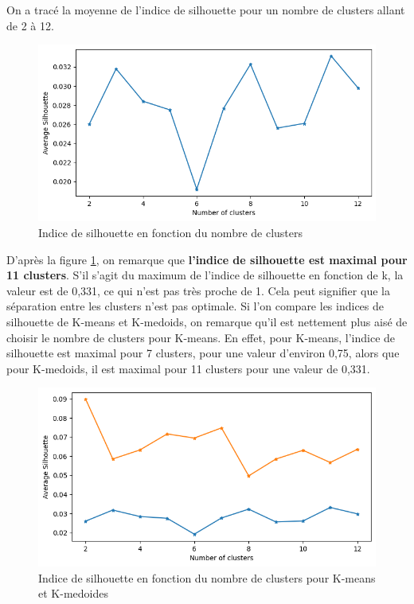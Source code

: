 \documentclass[french,a4paper,18pt]{article}
\begin{document}
On a tracé la moyenne de l'indice de silhouette pour un nombre de clusters allant de 2 à 12.

\begin{figure}[h!]
    \centering
    \includegraphics[scale=0.4]{../images/mnist_kmedoids_silhouette.png}
    \caption{Indice de silhouette en fonction du nombre de clusters}\label{fig:mnist_kmedoids_silhouette}
\end{figure}

D'après la figure \ref{fig:mnist_kmedoids_silhouette}, on remarque que \textbf{l'indice de silhouette est maximal pour 11 clusters}.
S'il s'agit du maximum de l'indice de silhouette en fonction de k, la valeur est de 0,331, ce qui n'est pas très proche de 1.
Cela peut signifier que la séparation entre les clusters n'est pas optimale.
Si l'on compare les indices de silhouette de K-means et K-medoids, on remarque qu'il est nettement plus aisé de choisir le nombre de clusters pour K-means.
En effet, pour K-means, l'indice de silhouette est maximal pour 7 clusters, pour une valeur d'environ 0,75, alors que pour K-medoids, il est maximal pour 11 clusters pour une valeur de 0,331.

\begin{figure}[h!]
    \centering
    \includegraphics[scale=0.4]{../images/mnist_comparison_silhouette.png}
    \caption{Indice de silhouette en fonction du nombre de clusters pour K-means et K-medoides}\label{fig:mnist_comparison_silhouette}
\end{figure}
\end{document}

